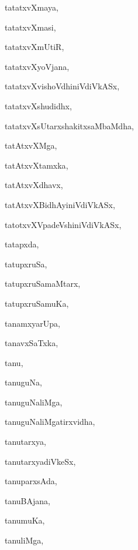 \begin{multicols}{3}
{\noindent
{tatatxvXmaya}, \pageref{tatatxvXmaya}

\noindent
{tatatxvXmasi}, \pageref{tatatxvXmasi}

\noindent
{tatatxvXmUtiR}, \pageref{tatatxvXmUtiR}

\noindent
{tatatxvXyoVjana}, \pageref{tatatxvXyoVjana}

\noindent
{tatatxvXvishoVdhiniVdiVkASx}, \pageref{tatatxvXvishoVdhiniVdiVkASx}

\noindent
{tatatxvXshudidhx}, \pageref{tatatxvXshudidhx}

\noindent
{tatatxvXsUtarxshakitxsaMbaMdha}, \pageref{tatatxvXsUtarxshakitxsaMbaMdha}

\noindent
{tatAtxvXMga}, \pageref{tatAtxvXMga}

\noindent
{tatAtxvXtamxka}, \pageref{tatAtxvXtamxka}

\noindent
{tatAtxvXdhavx}, \pageref{tatAtxvXdhavx}

\noindent
{tatAtxvXBidhAyiniVdiVkASx}, \pageref{tatAtxvXBidhAyiniVdiVkASx}

\noindent
{tatotxvXVpadeVshiniVdiVkASx}, \pageref{tatotxvXVpadeVshiniVdiVkASx}

\noindent
{tatapxda}, \pageref{tatapxda}

\noindent
{tatupxruSa}, \pageref{tatupxruSa}

\noindent
{tatupxruSamaMtarx}, \pageref{tatupxruSamaMtarx}

\noindent
{tatupxruSamuKa}, \pageref{tatupxruSamuKa}

\noindent
{tanamxyarUpa}, \pageref{tanamxyarUpa}

\noindent
{tanavxSaTxka}, \pageref{tanavxSaTxka}

\noindent
{tanu}, \pageref{tanu}

\noindent
{tanuguNa}, \pageref{tanuguNa}

\noindent
{tanuguNaliMga}, \pageref{tanuguNaliMga}

\noindent
{tanuguNaliMgatirxvidha}, \pageref{tanuguNaliMgatirxvidha}

\noindent
{tanutarxya}, \pageref{tanutarxya}

\noindent
{tanutarxyadiVkeSx}, \pageref{tanutarxyadiVkeSx}

\noindent
{tanuparxsAda}, \pageref{tanuparxsAda}

\noindent
{tanuBAjana}, \pageref{tanuBAjana}

\noindent
{tanumuKa}, \pageref{tanumuKa}

\noindent
{tanuliMga}, \pageref{tanuliMga}

}
\end{multicols}

